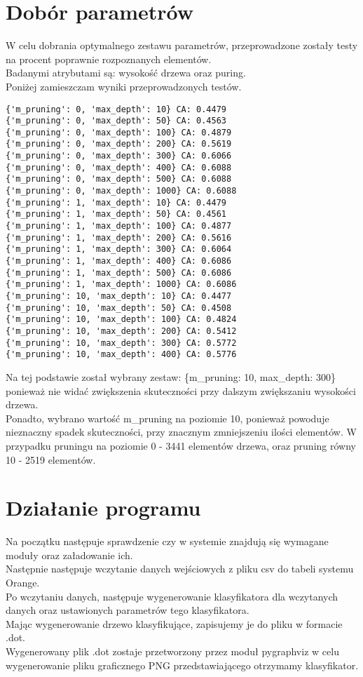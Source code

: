 \documentclass[a4paper,12pt]{article}
\begin{document}
\section{Dobór parametrów}
W celu dobrania optymalnego zestawu parametrów, przeprowadzone zostały testy na procent poprawnie rozpoznanych elementów.\\
Badanymi atrybutami są: wysokość drzewa oraz puring.\\
Poniżej zamieszczam wyniki przeprowadzonych testów.\\
\begin{verbatim}
{'m_pruning': 0, 'max_depth': 10} CA: 0.4479
{'m_pruning': 0, 'max_depth': 50} CA: 0.4563
{'m_pruning': 0, 'max_depth': 100} CA: 0.4879
{'m_pruning': 0, 'max_depth': 200} CA: 0.5619
{'m_pruning': 0, 'max_depth': 300} CA: 0.6066
{'m_pruning': 0, 'max_depth': 400} CA: 0.6088
{'m_pruning': 0, 'max_depth': 500} CA: 0.6088
{'m_pruning': 0, 'max_depth': 1000} CA: 0.6088
{'m_pruning': 1, 'max_depth': 10} CA: 0.4479
{'m_pruning': 1, 'max_depth': 50} CA: 0.4561
{'m_pruning': 1, 'max_depth': 100} CA: 0.4877
{'m_pruning': 1, 'max_depth': 200} CA: 0.5616
{'m_pruning': 1, 'max_depth': 300} CA: 0.6064
{'m_pruning': 1, 'max_depth': 400} CA: 0.6086
{'m_pruning': 1, 'max_depth': 500} CA: 0.6086
{'m_pruning': 1, 'max_depth': 1000} CA: 0.6086
{'m_pruning': 10, 'max_depth': 10} CA: 0.4477
{'m_pruning': 10, 'max_depth': 50} CA: 0.4508
{'m_pruning': 10, 'max_depth': 100} CA: 0.4824
{'m_pruning': 10, 'max_depth': 200} CA: 0.5412
{'m_pruning': 10, 'max_depth': 300} CA: 0.5772
{'m_pruning': 10, 'max_depth': 400} CA: 0.5776
\end{verbatim}
Na tej podstawie został wybrany zestaw: \{m\_pruning: 10, max\_depth: 300\} ponieważ nie widać zwiększenia skuteczności przy dalszym zwiększaniu wysokości drzewa.\\
Ponadto, wybrano wartość m\_pruning na poziomie 10, ponieważ powoduje nieznaczny spadek skuteczności, przy znacznym zmniejszeniu ilości elementów.
W przypadku pruningu na poziomie 0 - 3441 elementów drzewa, oraz pruning równy 10 - 2519 elementów.
\section{Działanie programu}
Na początku następuje sprawdzenie czy w systemie znajdują się wymagane moduły oraz załadowanie ich.\\
Następnie następuje wczytanie danych wejściowych z pliku csv do tabeli systemu Orange.\\
Po wczytaniu danych, następuje wygenerowanie klasyfikatora dla wczytanych danych oraz ustawionych parametrów tego klasyfikatora.\\
Mając wygenerowanie drzewo klasyfikujące, zapisujemy je do pliku w formacie .dot.\\
Wygenerowany plik .dot zostaje przetworzony przez moduł pygraphviz w celu wygenerowanie pliku graficznego PNG przedstawiającego otrzymamy klasyfikator.
\end{document}
